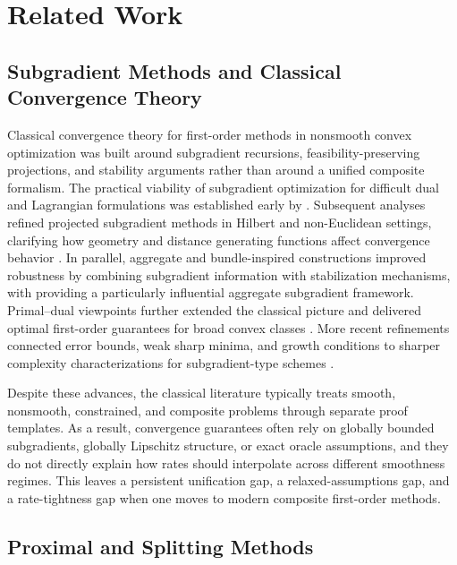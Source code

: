 \documentclass[11pt]{article}
\begin{document}
\section{Related Work}

\subsection{Subgradient Methods and Classical Convergence Theory}

Classical convergence theory for first-order methods in nonsmooth convex optimization was built around subgradient recursions, feasibility-preserving projections, and stability arguments rather than around a unified composite formalism. The practical viability of subgradient optimization for difficult dual and Lagrangian formulations was established early by \citet{held1974validation}. Subsequent analyses refined projected subgradient methods in Hilbert and non-Euclidean settings, clarifying how geometry and distance generating functions affect convergence behavior \citep{alber1998projected,auslender2007projected}. In parallel, aggregate and bundle-inspired constructions improved robustness by combining subgradient information with stabilization mechanisms, with \citet{kiwiel1983aggregate} providing a particularly influential aggregate subgradient framework. Primal--dual viewpoints further extended the classical picture and delivered optimal first-order guarantees for broad convex classes \citep{nedic2007primaldual}. More recent refinements connected error bounds, weak sharp minima, and growth conditions to sharper complexity characterizations for subgradient-type schemes \citep{burke1999linear,kiwiel2001quasiconvex,renegar2019faster}.

Despite these advances, the classical literature typically treats smooth, nonsmooth, constrained, and composite problems through separate proof templates. As a result, convergence guarantees often rely on globally bounded subgradients, globally Lipschitz structure, or exact oracle assumptions, and they do not directly explain how rates should interpolate across different smoothness regimes. This leaves a persistent unification gap, a relaxed-assumptions gap, and a rate-tightness gap when one moves to modern composite first-order methods.

\subsection{Proximal and Splitting Methods}
\end{document}
